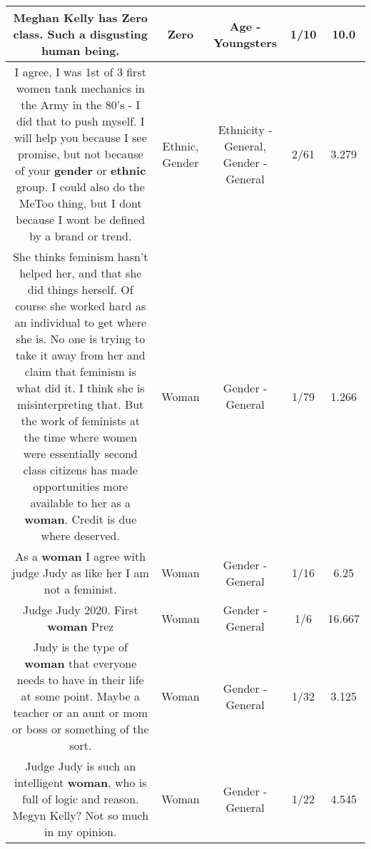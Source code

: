 \documentclass[11pt]{article}
\newlength\mylength
\begin{document}
\begin{center}
\begin{longtable}{|C{.65\mylength}|C{.30\mylength}|C{.12\mylength}|C{.12\mylength}|C{.12\mylength}|}
  \small Meghan Kelly has \textbf{Zero} class. Such a disgusting human being.\normalsize   & Zero & Age - Youngsters & 1/10 & 10.0 \\  \hline
  \small I agree, I was 1st of 3 first women tank mechanics in the Army in the 80's - I did that to push myself.  I will help you because I see promise, but not because of your \textbf{gender} or \textbf{ethnic} group.  I could also do the MeToo thing, but I dont because I wont be defined by a brand or trend.\normalsize   & Ethnic, Gender & Ethnicity - General, Gender - General & 2/61 & 3.279 \\  \hline
  \small She thinks feminism hasn't helped her, and that she did things herself. Of course she worked hard as an individual to get where she is. No one is trying to take it away from her and claim that feminism is what did it. I think she is misinterpreting that. But the work of feminists at the time where women were essentially second class citizens has made opportunities more available to her as a \textbf{woman}.  Credit is due where deserved.\normalsize   & Woman & Gender - General & 1/79 & 1.266 \\  \hline
  \small As a \textbf{woman} I agree with judge Judy as like her I am not a feminist.\normalsize   & Woman & Gender - General & 1/16 & 6.25 \\  \hline
  \small Judge Judy 2020.  First \textbf{woman} Prez\normalsize   & Woman & Gender - General & 1/6 & 16.667 \\  \hline
  \small Judy is the type of \textbf{woman} that everyone needs to have in their life at some point. Maybe a teacher or an aunt or mom or boss or something of the sort.\normalsize   & Woman & Gender - General & 1/32 & 3.125 \\  \hline
  \small Judge Judy is such an intelligent \textbf{woman}, who is full of logic and reason. Megyn Kelly? Not so much in my opinion.\normalsize   & Woman & Gender - General & 1/22 & 4.545 \\  \hline

\end{longtable}
\end{center}
\end{document}
